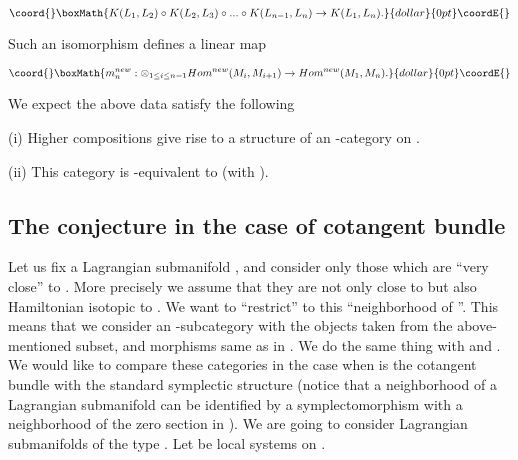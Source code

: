\documentclass[a4paper,12pt]{article}
\begin{document}
$$\coord{}\boxMath{K(L_1,L_2)\circ K(L_2,L_3)\circ...\circ K(L_{n-1},L_n)
\to K(L_1,L_n).}{dollar}{0pt}\coordE{}$$

Such an isomorphism defines a linear map

$$\coord{}\boxMath{m_n^{new}:\otimes_{1\le i\le n-1}Hom^{new}(M_{i},M_{{i+1}})\to
Hom^{new}(M_{1},M_{n}).}{dollar}{0pt}\coordE{}$$




We expect the above data satisfy the following

\begin{conj} (i)  Higher compositions \coordHE{} give rise
to a structure of an  \myHighlight{$\A$}\coordHE{}-category on \coordHE{}.

(ii) This category is \myHighlight{$\A$}\coordHE{}-equivalent to \coordHE{} (with \coordHE{}).

\end{conj}

\subsection {The conjecture in the case of cotangent bundle}

Let us fix a Lagrangian submanifold \coordHE{}, and consider
only those \coordHE{} which are ``very close'' to \coordHE{}.
More precisely we assume that they are not only close
to \coordHE{} but also Hamiltonian isotopic to \coordHE{}.
We want to  ``restrict'' \coordHE{} to this ``neighborhood of \coordHE{}''.
This means that we consider an \myHighlight{$\A$}\coordHE{}-subcategory with the
objects taken from the above-mentioned subset, and morphisms
same as in \coordHE{}. We do the same thing with \coordHE{} and 
\coordHE{}. We would like to compare these categories
in the case when \coordHE{} is the cotangent bundle
with the standard symplectic structure (notice that a neighborhood of a
Lagrangian submanifold \coordHE{} can be identified by a symplectomorphism
with a neighborhood of the zero section in \coordHE{}).
We are going to consider Lagrangian
submanifolds of the type \coordHE{}.
Let \coordHE{} be local systems on \coordHE{}.
\end{document}
